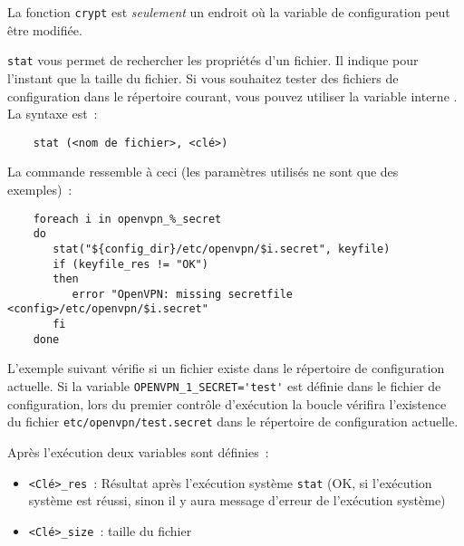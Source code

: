 La fonction \texttt{crypt} est \emph{seulement} un endroit où la variable de configuration
peut être modifiée.



    \texttt{stat} vous permet de rechercher les propriétés d'un fichier. Il indique
    pour l'instant que la taille du fichier. Si vous souhaitez tester des fichiers
	de configuration dans le répertoire courant, vous pouvez utiliser la variable
	interne . La syntaxe est~:

\begin{example}
\begin{verbatim}
    stat (<nom de fichier>, <clé>)
\end{verbatim}
\end{example}

    La commande ressemble à ceci (les paramètres utilisés ne sont que des exemples)~:

\begin{example}
\begin{verbatim}
    foreach i in openvpn_%_secret
    do
       stat("${config_dir}/etc/openvpn/$i.secret", keyfile)
       if (keyfile_res != "OK")
       then
          error "OpenVPN: missing secretfile <config>/etc/openvpn/$i.secret"
       fi
    done
\end{verbatim}
\end{example}

	L'exemple suivant vérifie si un fichier existe dans le répertoire de configuration
	actuelle. Si la variable \verb+OPENVPN_1_SECRET='test'+ est définie dans le fichier
	de configuration, lors du premier contrôle d'exécution la boucle vérifira l'existence du fichier
	\texttt{etc/openvpn/test.secret} dans le répertoire de configuration actuelle.

    Après l'exécution deux variables sont définies~:

    \begin{itemize}
    \item \texttt{<Clé>\_res}~:
    Résultat après l'exécution système \texttt{stat} (\og{}OK\fg{}, si l'exécution système
	est réussi, sinon il y aura message d'erreur de l'exécution système)
    \item \texttt{<Clé>\_size}~:
    taille du fichier
    \end{itemize}

